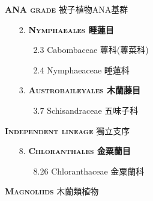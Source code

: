 \noindent \normalsize\textsc{\textbf{ANA grade} 被子植物ANA基群}\selectfont \\
\footnotesize\selectfont
\begin{enumerate}
  \item[2. ] \textbf{\textsc{Nymphaeales} 睡蓮目} 
    \begin{enumerate}
      \item[2.3] Cabombaceae 蓴科(蓴菜科)  
        
      \item[2.4] Nymphaeaceae 睡蓮科  
        
    \end{enumerate}
  \item[3. ] \textbf{\textsc{Austrobaileyales} 木蘭藤目} 
    \begin{enumerate}
      \item[3.7] Schisandraceae 五味子科  
        
    \end{enumerate}
\end{enumerate}
\vspace{2ex} 
\noindent \normalsize\textsc{\textbf{Independent lineage} 獨立支序}\selectfont \\
\footnotesize\selectfont
\begin{enumerate}
  \item[8. ] \textbf{\textsc{Chloranthales} 金粟蘭目} 
    \begin{enumerate}
      \item[8.26] Chloranthaceae 金粟蘭科  
        
    \end{enumerate}
\end{enumerate}
\vspace{2ex} 
\noindent \normalsize\textsc{\textbf{Magnoliids} 木蘭類植物}\selectfont \\
\footnotesize\selectfont
